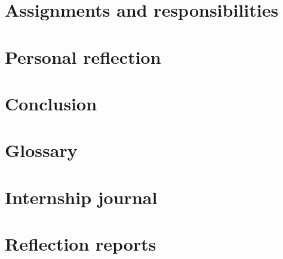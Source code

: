 \documentclass[10pt,a4paper]{article}
\begin{document}
  \section{Assignments and responsibilities}
  
  \section{Personal reflection}
  
  \section{Conclusion}
  
  \section*{Glossary}
  
  \printbibliography[heading=bibintoc]
 
  \begin{appendices}
  	\section{Internship journal}
  	\section{Reflection reports}
  \end{appendices}
  
\end{document}
